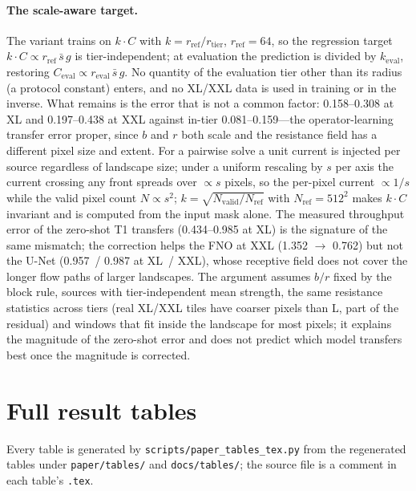 \documentclass{article}
\newcommand{\code}[1]{\texttt{#1}}
\begin{document}
\paragraph{The scale-aware target.} The variant trains on $k\cdot C$ with $k=r_{\mathrm{ref}}/r_{\mathrm{tier}}$, $r_{\mathrm{ref}}=64$, so the regression target $k\cdot C\propto r_{\mathrm{ref}}\,\bar s\,g$ is tier-independent; at evaluation the prediction is divided by $k_{\mathrm{eval}}$, restoring $C_{\mathrm{eval}}\propto r_{\mathrm{eval}}\,\bar s\,g$. No quantity of the evaluation tier other than its radius (a protocol constant) enters, and no XL/XXL data is used in training or in the inverse. What remains is the error that is not a common factor: 0.158--0.308 at XL and 0.197--0.438 at XXL against in-tier 0.081--0.159---the operator-learning transfer error proper, since $b$ and $r$ both scale and the resistance field has a different pixel size and extent. For a pairwise solve a unit current is injected per source regardless of landscape size; under a uniform rescaling by $s$ per axis the current crossing any front spreads over $\propto s$ pixels, so the per-pixel current $\propto 1/s$ while the valid pixel count $N\propto s^2$; $k=\sqrt{N_{\mathrm{valid}}/N_{\mathrm{ref}}}$ with $N_{\mathrm{ref}}=512^2$ makes $k\cdot C$ invariant and is computed from the input mask alone. The measured throughput error of the zero-shot T1 transfers (0.434--0.985 at XL) is the signature of the same mismatch; the correction helps the FNO at XXL (1.352 $\rightarrow$ 0.762) but not the U-Net (0.957~/ 0.987 at XL~/ XXL), whose receptive field does not cover the longer flow paths of larger landscapes. The argument assumes $b/r$ fixed by the block rule, sources with tier-independent mean strength, the same resistance statistics across tiers (real XL/XXL tiles have coarser pixels than L, part of the residual) and windows that fit inside the landscape for most pixels; it explains the magnitude of the zero-shot error and does not predict which model transfers best once the magnitude is corrected.

\FloatBarrier
\section{Full result tables}
\label{app:tables}

Every table is generated by \code{scripts/paper\_tables\_tex.py} from the regenerated tables under \code{paper/tables/} and \code{docs/tables/}; the source file is a comment in each table's \code{.tex}.
\end{document}
